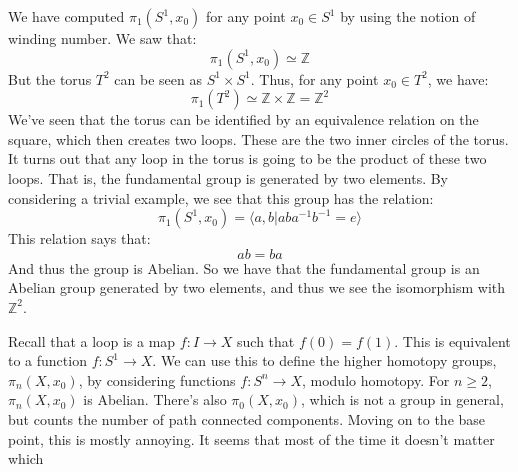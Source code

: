         \begin{example}
            We have computed $\pi_{1}(S^{1},x_{0})$ for any
            point $x_{0}\in{S}^{1}$ by using the notion of
            winding number. We saw that:
            \begin{equation}
                \pi_{1}(S^{1},x_{0})\simeq\mathbb{Z}
            \end{equation}
            But the torus $T^{2}$ can be seen as
            $S^{1}\times{S}^{1}$. Thus, for any point
            $x_{0}\in{T}^{2}$, we have:
            \begin{equation}
                \pi_{1}(T^{2})\simeq
                \mathbb{Z}\times\mathbb{Z}
                =\mathbb{Z}^{2}
            \end{equation}
            We've seen that the torus can be identified by
            an equivalence relation on the square, which then
            creates two loops. These are the two inner circles
            of the torus. It turns out that any loop in the
            torus is going to be the product of these two loops.
            That is, the fundamental group is generated by
            two elements. By considering a trivial example,
            we see that this group has the relation:
            \begin{equation}
                \pi_{1}(S^{1},x_{0})=
                \langle{a,b}|aba^{-1}b^{-1}=e\rangle
            \end{equation}
            This relation says that:
            \begin{equation}
                ab=ba
            \end{equation}
            And thus the group is Abelian. So we have that
            the fundamental group is an Abelian group
            generated by two elements, and thus we see the
            isomorphism with $\mathbb{Z}^{2}$.
        \end{example}
        Recall that a loop is a map $f:I\rightarrow{X}$
        such that $f(0)=f(1)$. This is equivalent to a
        function $f:S^{1}\rightarrow{X}$. We can use this to
        define the higher homotopy groups, $\pi_{n}(X,x_{0})$,
        by considering functions $f:S^{n}\rightarrow{X}$,
        modulo homotopy. For $n\geq{2}$,
        $\pi_{n}(X,x_{0})$ is Abelian. There's also
        $\pi_{0}(X,x_{0})$, which is not a group in general,
        but counts the number of path connected components.
        Moving on to the base point, this is mostly annoying.
        It seems that most of the time it doesn't matter which
